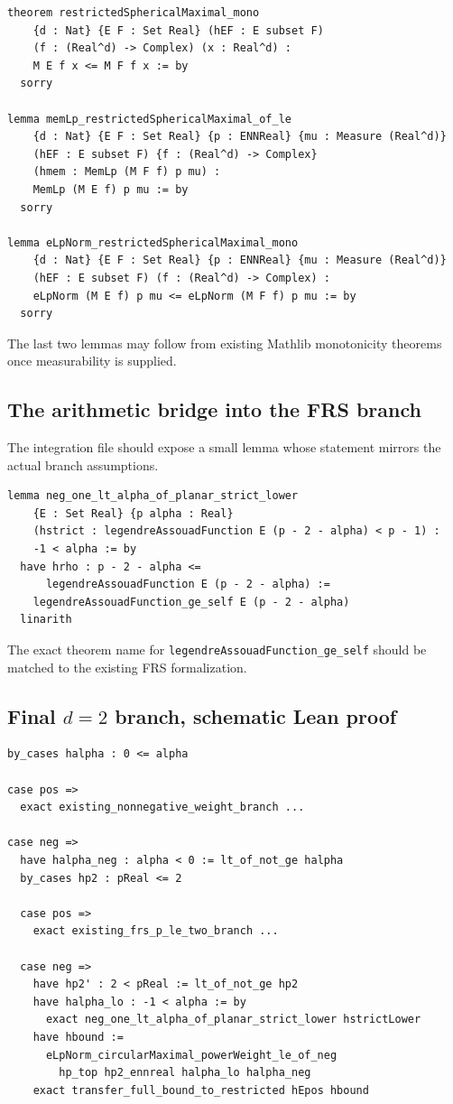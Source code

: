 \documentclass[11pt,a4paper]{article}
\theoremstyle{definition}
\theoremstyle{remark}
\newcommand{\lean}{\texttt}
\begin{document}
\begin{lstlisting}
theorem restrictedSphericalMaximal_mono
    {d : Nat} {E F : Set Real} (hEF : E subset F)
    (f : (Real^d) -> Complex) (x : Real^d) :
    M E f x <= M F f x := by
  sorry

lemma memLp_restrictedSphericalMaximal_of_le
    {d : Nat} {E F : Set Real} {p : ENNReal} {mu : Measure (Real^d)}
    (hEF : E subset F) {f : (Real^d) -> Complex}
    (hmem : MemLp (M F f) p mu) :
    MemLp (M E f) p mu := by
  sorry

lemma eLpNorm_restrictedSphericalMaximal_mono
    {d : Nat} {E F : Set Real} {p : ENNReal} {mu : Measure (Real^d)}
    (hEF : E subset F) (f : (Real^d) -> Complex) :
    eLpNorm (M E f) p mu <= eLpNorm (M F f) p mu := by
  sorry
\end{lstlisting}

The last two lemmas may follow from existing Mathlib monotonicity theorems once
measurability is supplied.

\subsection{The arithmetic bridge into the FRS branch}

The integration file should expose a small lemma whose statement mirrors the
actual branch assumptions.

\begin{lstlisting}
lemma neg_one_lt_alpha_of_planar_strict_lower
    {E : Set Real} {p alpha : Real}
    (hstrict : legendreAssouadFunction E (p - 2 - alpha) < p - 1) :
    -1 < alpha := by
  have hrho : p - 2 - alpha <=
      legendreAssouadFunction E (p - 2 - alpha) :=
    legendreAssouadFunction_ge_self E (p - 2 - alpha)
  linarith
\end{lstlisting}

The exact theorem name for \lean{legendreAssouadFunction\_ge\_self} should be
matched to the existing FRS formalization.

\subsection{Final $d=2$ branch, schematic Lean proof}

\begin{lstlisting}
by_cases halpha : 0 <= alpha

case pos =>
  exact existing_nonnegative_weight_branch ...

case neg =>
  have halpha_neg : alpha < 0 := lt_of_not_ge halpha
  by_cases hp2 : pReal <= 2

  case pos =>
    exact existing_frs_p_le_two_branch ...

  case neg =>
    have hp2' : 2 < pReal := lt_of_not_ge hp2
    have halpha_lo : -1 < alpha := by
      exact neg_one_lt_alpha_of_planar_strict_lower hstrictLower
    have hbound :=
      eLpNorm_circularMaximal_powerWeight_le_of_neg
        hp_top hp2_ennreal halpha_lo halpha_neg
    exact transfer_full_bound_to_restricted hEpos hbound
\end{lstlisting}
\end{document}
